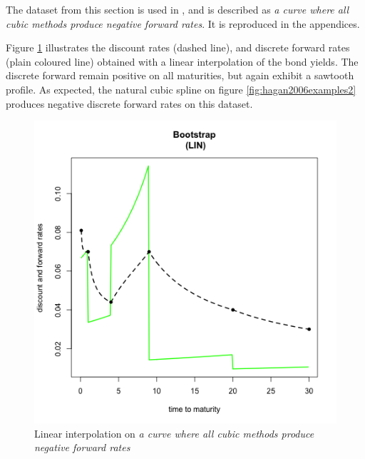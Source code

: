 The dataset from this section is used in \cite{hagan2006interpolation}, and is described as \textit{a curve where all cubic methods produce negative forward rates}. It is reproduced in the appendices.

\medskip

Figure \ref{fig:hagan2006examples1} illustrates the discount rates (dashed line), and discrete forward rates (plain coloured line) obtained with a linear interpolation of the bond yields. The discrete forward remain positive on all maturities, but again exhibit a sawtooth profile. As expected, the natural cubic spline on figure \ref{fig:hagan2006examples2} produces negative discrete forward rates on this dataset.

\begin{figure}[!htb]
    \centering
    \begin{minipage}{.5\textwidth}
        \centering
        \includegraphics[width=1.06\linewidth, height=0.285\textheight]{gfx/chapter-yc-insurance/construction_graph13}
        \caption{Linear interpolation on \textit{a curve where all cubic methods produce negative forward rates}}
        \label{fig:hagan2006examples1}
    \end{minipage}%
    \begin{minipage}{0.5\textwidth}
        \centering

\end{minipage}
\end{figure}
